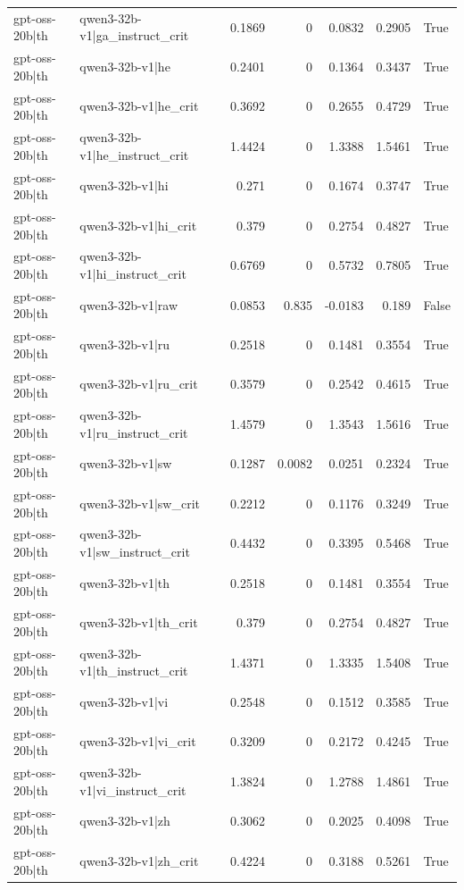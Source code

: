 \begin{table}
\begin{tabular}{l l r r r r l}
gpt-oss-20b|th & qwen3-32b-v1|ga_instruct_crit & 0.1869 & 0 & 0.0832 & 0.2905 & True \\
gpt-oss-20b|th & qwen3-32b-v1|he & 0.2401 & 0 & 0.1364 & 0.3437 & True \\
gpt-oss-20b|th & qwen3-32b-v1|he_crit & 0.3692 & 0 & 0.2655 & 0.4729 & True \\
gpt-oss-20b|th & qwen3-32b-v1|he_instruct_crit & 1.4424 & 0 & 1.3388 & 1.5461 & True \\
gpt-oss-20b|th & qwen3-32b-v1|hi & 0.271 & 0 & 0.1674 & 0.3747 & True \\
gpt-oss-20b|th & qwen3-32b-v1|hi_crit & 0.379 & 0 & 0.2754 & 0.4827 & True \\
gpt-oss-20b|th & qwen3-32b-v1|hi_instruct_crit & 0.6769 & 0 & 0.5732 & 0.7805 & True \\
gpt-oss-20b|th & qwen3-32b-v1|raw & 0.0853 & 0.835 & -0.0183 & 0.189 & False \\
gpt-oss-20b|th & qwen3-32b-v1|ru & 0.2518 & 0 & 0.1481 & 0.3554 & True \\
gpt-oss-20b|th & qwen3-32b-v1|ru_crit & 0.3579 & 0 & 0.2542 & 0.4615 & True \\
gpt-oss-20b|th & qwen3-32b-v1|ru_instruct_crit & 1.4579 & 0 & 1.3543 & 1.5616 & True \\
gpt-oss-20b|th & qwen3-32b-v1|sw & 0.1287 & 0.0082 & 0.0251 & 0.2324 & True \\
gpt-oss-20b|th & qwen3-32b-v1|sw_crit & 0.2212 & 0 & 0.1176 & 0.3249 & True \\
gpt-oss-20b|th & qwen3-32b-v1|sw_instruct_crit & 0.4432 & 0 & 0.3395 & 0.5468 & True \\
gpt-oss-20b|th & qwen3-32b-v1|th & 0.2518 & 0 & 0.1481 & 0.3554 & True \\
gpt-oss-20b|th & qwen3-32b-v1|th_crit & 0.379 & 0 & 0.2754 & 0.4827 & True \\
gpt-oss-20b|th & qwen3-32b-v1|th_instruct_crit & 1.4371 & 0 & 1.3335 & 1.5408 & True \\
gpt-oss-20b|th & qwen3-32b-v1|vi & 0.2548 & 0 & 0.1512 & 0.3585 & True \\
gpt-oss-20b|th & qwen3-32b-v1|vi_crit & 0.3209 & 0 & 0.2172 & 0.4245 & True \\
gpt-oss-20b|th & qwen3-32b-v1|vi_instruct_crit & 1.3824 & 0 & 1.2788 & 1.4861 & True \\
gpt-oss-20b|th & qwen3-32b-v1|zh & 0.3062 & 0 & 0.2025 & 0.4098 & True \\
gpt-oss-20b|th & qwen3-32b-v1|zh_crit & 0.4224 & 0 & 0.3188 & 0.5261 & True \\

\end{tabular}
\end{table}
